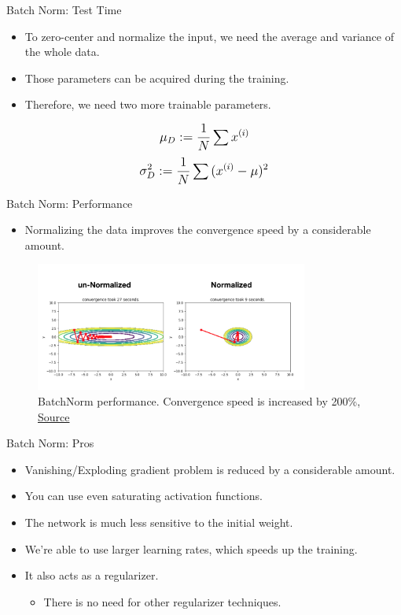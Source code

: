 \begin{frame}{Batch Norm: Test Time}
	\begin{itemize}
		\item To zero-center and normalize the input, we need the average and variance of the whole data.
		\medskip
		\item Those parameters can be acquired during the training.
		\medskip
		\item Therefore, we need two more trainable parameters.
	\end{itemize}
	\vspace{0.1\textheight}
		\begin{equation*}
			\mathlarger{
				\mu_D := \frac{1}{N} \sum{x^{(i)}}
			}
		\end{equation*}
		\begin{equation*}
			\mathlarger{
				\sigma_D^2 := \frac{1}{N} \sum{(x^{(i)} - \mu)^2}
			}
		\end{equation*}
\end{frame}
\begin{frame}{Batch Norm: Performance}
	\begin{itemize}
		\item Normalizing the data improves the convergence speed by a considerable amount.
	\end{itemize}
	\begin{figure}[H]
		\centering
		\includegraphics[width=0.8\textwidth]{Figs/section_4/batchnorm_3.png}
		\caption{BatchNorm performance. Convergence speed is increased by 200\%,  \href{https://jsideas.net/batch_normalization/}{Source}}
	\end{figure}
\end{frame}
\begin{frame}{Batch Norm: Pros}
	\begin{itemize}
		\item Vanishing/Exploding gradient problem is reduced by a considerable amount.
		\medskip
			\item You can use even saturating activation functions.
			\medskip
			\item The network is much less sensitive to the initial weight.
			\medskip
			\item We're able to use larger learning rates, which speeds up the training.
		\medskip
		\item It also acts as a regularizer.
		\medskip
		\begin{itemize}
			\item There is no need for other regularizer techniques.
		\end{itemize}
	\end{itemize}
\end{frame}
